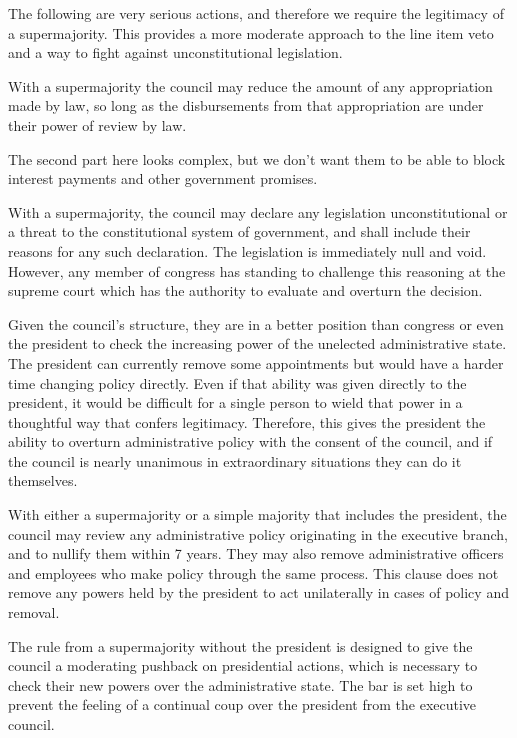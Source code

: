 \documentclass{article}
\begin{document}
The following are very serious actions, and therefore we require the legitimacy of a supermajority. This provides a more moderate approach to the line item veto and a way to fight against unconstitutional legislation.

\begin{quoting}
With a supermajority the council may reduce the amount of any appropriation made by law, so long as the disbursements from that appropriation are under their power of review by law.
\end{quoting}

The second part here looks complex, but we don’t want them to be able to block interest payments and other government promises.

\begin{quoting}
With a supermajority, the council may declare any legislation unconstitutional or a threat to the constitutional system of government, and shall include their reasons for any such declaration. The legislation is immediately null and void. However, any member of congress has standing to challenge this reasoning at the supreme court which has the authority to evaluate and overturn the decision.
\end{quoting}

Given the council’s structure, they are in a better position than congress or even the president to check the increasing power of the unelected administrative state. The president can currently remove some appointments but would have a harder time changing policy directly\cite{Fairlie}. Even if that ability was given directly to the president, it would be difficult for a single person to wield that power in a thoughtful way that confers legitimacy. Therefore, this gives the president the ability to overturn administrative policy with the consent of the council, and if the council is nearly unanimous in extraordinary situations they can do it themselves.

\begin{quoting}
With either a supermajority or a simple majority that includes the president, the council may review any administrative policy originating in the executive branch, and to nullify them within 7 years. They may also remove administrative officers and employees who make policy through the same process. This clause does not remove any powers held by the president to act unilaterally in cases of policy and removal.
\end{quoting}

The rule from a supermajority without the president is designed to give the council a moderating pushback on presidential actions, which is necessary to check their new powers over the administrative state. The bar is set high to prevent the feeling of a continual coup over the president from the executive council.
\end{document}
